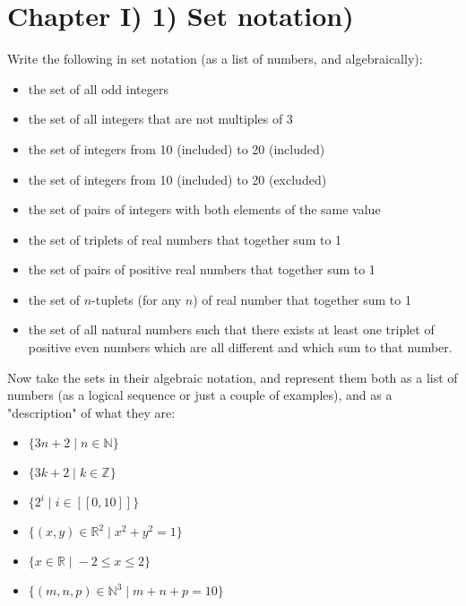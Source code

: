 \documentclass[12pt, letterpaper, twoside]{report}
\begin{document}
\section*{Chapter I) 1) Set notation)}

Write the following in set notation (as a list of numbers, and algebraically):
\begin{itemize}
	\item the set of all odd integers
	\item the set of all integers that are not multiples of 3
	\item the set of integers from 10 (included) to 20 (included)
	\item the set of integers from 10 (included) to 20 (excluded)
	\item the set of pairs of integers with both elements of the same value
	\item the set of triplets of real numbers that together sum to 1
	\item the set of pairs of positive real numbers that together sum to 1
	\item the set of $n$-tuplets (for any $n$) of real number that together sum to 1
	\item the set of all natural numbers such that there exists at least one triplet of positive even numbers which are all different and which sum to that number.
\end{itemize}

Now take the sets in their algebraic notation, and represent them both as a list of numbers (as a logical sequence or just a couple of examples), and as a "description" of what they are:

\begin{itemize}
	\item $\{3n + 2 \; | \; n \in \mathbb{N} \}$
	\item $\{3k + 2 \; | \; k \in \mathbb{Z} \}$
	\item $\{ 2^i \; | \; i \in [[0, 10]] \}$
	\item $\{ (x, y) \in \mathbb{R}^2 \; | \; x^2 + y^2 = 1 \}$
	\item $\{ x \in \mathbb{R} \; | \; -2 \leq x \leq 2 \}$
	\item $\{ (m, n, p) \in \mathbb{N}^3 \; | \; m + n + p = 10 \}$
\end{itemize}

\newpage
\end{document}
